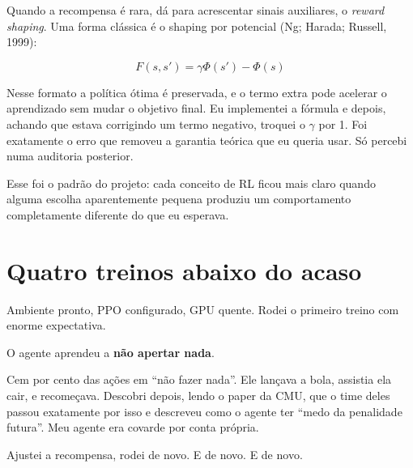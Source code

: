 \documentclass[10pt,a4paper,twoside,twocolumn]{scrartcl}
\begin{document}
Quando a recompensa é rara, dá para acrescentar sinais auxiliares, o
\emph{reward shaping}. Uma forma clássica é o shaping por potencial (Ng;
Harada; Russell, 1999):

\[F(s, s') = \gamma \Phi(s') - \Phi(s)\]

Nesse formato a política ótima é preservada, e o termo extra pode
acelerar o aprendizado sem mudar o objetivo final. Eu implementei a
fórmula e depois, achando que estava corrigindo um termo negativo,
troquei o \(\gamma\) por 1. Foi exatamente o erro que removeu a garantia
teórica que eu queria usar. Só percebi numa auditoria posterior.

Esse foi o padrão do projeto: cada conceito de RL ficou mais claro
quando alguma escolha aparentemente pequena produziu um comportamento
completamente diferente do que eu esperava.

\section{Quatro treinos abaixo do
acaso}\label{quatro-treinos-abaixo-do-acaso}

Ambiente pronto, PPO configurado, GPU quente. Rodei o primeiro treino
com enorme expectativa.

O agente aprendeu a \textbf{não apertar nada}.

Cem por cento das ações em ``não fazer nada''. Ele lançava a bola,
assistia ela cair, e recomeçava. Descobri depois, lendo o paper da CMU,
que o time deles passou exatamente por isso e descreveu como o agente
ter ``medo da penalidade futura''. Meu agente era covarde por conta
própria.

Ajustei a recompensa, rodei de novo. E de novo. E de novo.

\vspace{0.2em}
\begin{center}\small
{}
\end{center}
\vspace{0.1em}
\end{document}

